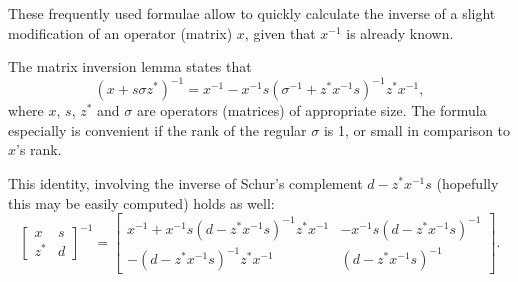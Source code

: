 \documentclass[12pt]{article}
\begin{document}
These frequently used formulae allow to quickly calculate the inverse of a slight modification of an operator (matrix) $x$, given that $x^{-1}$ is already known.

The matrix inversion lemma states that $$\left( x+ s \sigma z^* \right)^{-1} = x^{-1} - x^{-1} s \left( \sigma^{-1} + z^* x^{-1} s \right)^{-1} z^* x^{-1},$$ where $x$, $s$, $z^*$ and $\sigma$ are operators (matrices) of appropriate size. The formula especially is convenient if the rank of the regular $\sigma$ is 1, or small in comparison to $x$'s rank.

This identity, involving the inverse of Schur's complement $d- z^* x^{-1} s$ (hopefully this may be easily computed) holds as well: $$\begin{bmatrix} x & s \\ z^* & d \end{bmatrix}^{-1} = \begin{bmatrix} x^{-1}+ x^{-1} s (d- z^* x^{-1} s)^{-1} z^* x^{-1} & -x^{-1} s (d-z^*x^{-1}s)^{-1} \\ -(d-z^*x^{-1}s)^{-1} z^* x^{-1} & (d-z^*x^{-1}s)^{-1} \end{bmatrix}.$$
\end{document}
